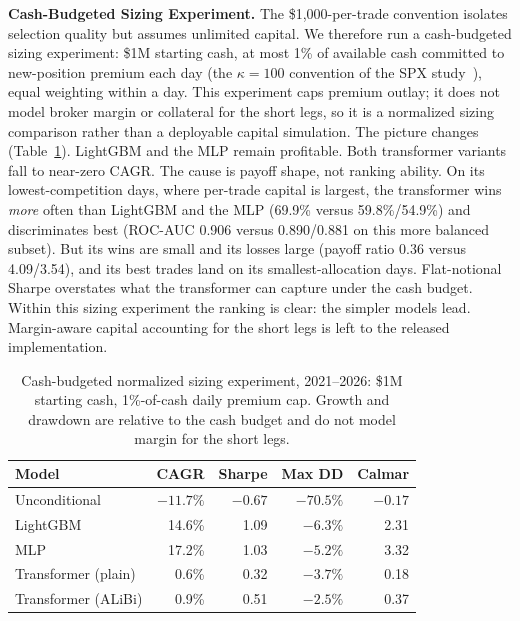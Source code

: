 \documentclass[sigconf,review,anonymous]{acmart}
\begin{document}
\medskip\noindent\textbf{Cash-Budgeted Sizing Experiment.}
\label{sec:capitalscaled}
The \$1{,}000-per-trade convention isolates selection quality but assumes unlimited capital. We therefore run a cash-budgeted sizing experiment: \$1M starting cash, at most 1\% of available cash committed to new-position premium each day (the $\kappa=100$ convention of the SPX study~\cite{glasserman2025tp2}), equal weighting within a day. This experiment caps premium outlay; it does not model broker margin or collateral for the short legs, so it is a normalized sizing comparison rather than a deployable capital simulation. The picture changes (Table~\ref{tab:capitalscaled}). LightGBM and the MLP remain profitable. Both transformer variants fall to near-zero CAGR. The cause is payoff shape, not ranking ability. On its lowest-competition days, where per-trade capital is largest, the transformer wins \emph{more} often than LightGBM and the MLP (69.9\% versus 59.8\%/54.9\%) and discriminates best (ROC-AUC 0.906 versus 0.890/0.881 on this more balanced subset). But its wins are small and its losses large (payoff ratio 0.36 versus 4.09/3.54), and its best trades land on its smallest-allocation days. Flat-notional Sharpe overstates what the transformer can capture under the cash budget. Within this sizing experiment the ranking is clear: the simpler models lead. Margin-aware capital accounting for the short legs is left to the released implementation.

\begin{table}[t]
\centering
\footnotesize
\begin{tabular}{lrrrr}
\toprule
Model & CAGR & Sharpe & Max DD & Calmar \\
\midrule
Unconditional & $-11.7\%$ & $-0.67$ & $-70.5\%$ & $-0.17$ \\
LightGBM & 14.6\% & 1.09 & $-6.3\%$ & 2.31 \\
MLP & 17.2\% & 1.03 & $-5.2\%$ & 3.32 \\
Transformer (plain) & 0.6\% & 0.32 & $-3.7\%$ & 0.18 \\
Transformer (ALiBi) & 0.9\% & 0.51 & $-2.5\%$ & 0.37 \\
\bottomrule
\end{tabular}
\caption{Cash-budgeted normalized sizing experiment, 2021--2026: \$1M starting cash, 1\%-of-cash daily premium cap. Growth and drawdown are relative to the cash budget and do not model margin for the short legs.}
\label{tab:capitalscaled}
\end{table}
\end{document}
